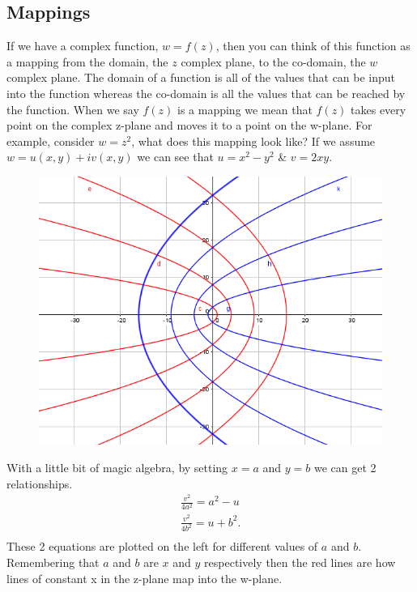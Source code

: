 \subsection{Mappings}
If we have a complex function, $w=f(z)$, then you can think of this function as a mapping from the domain, the $z$ complex plane, to the co-domain, the $w$ complex plane.
The domain of a function is all of the values that can be input into the function whereas the co-domain is all the values that can be reached by the function.
When we say $f(z)$ is a mapping we mean that $f(z)$ takes every point on the complex z-plane and moves it to a point on the w-plane.
 For example, consider $w=z^2$, what does this mapping look like?
  If we assume $w=u(x,y)+iv(x,y)$ we can see that $u=x^2-y^2$ \& $v=2xy$.

\begin{minipage}[t]{0.47\linewidth}
	\begin{figure}[H]
		\centering
		\includegraphics[width=\linewidth]{complex/mapping}
		\captionsetup{font=small} 	
	\end{figure} 
\end{minipage}
\hspace{0.6cm}
%
\begin{minipage}[t]{0.47\linewidth}
	\vspace{0.3cm}
	With a little bit of magic algebra, by setting $x=a$ and $y=b$ we can get 2 relationships.
	\begin{align*}
	\frac{v^2}{4a^2}=a^2-u \\
	\frac{v^2}{4b^2}=u+b^2. \\
	\end{align*}
These 2 equations are plotted on the left for different values of $a$ and $b$.
 Remembering that $a$ and $b$ are $x$ and $y$ respectively then the red lines are how lines of constant x in the z-plane map into the w-plane.
\end{minipage}
